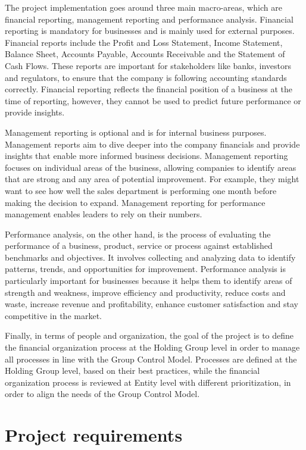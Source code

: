 \documentclass[12pt,a4paper,openright,twoside]{book}
\begin{document}
The project implementation goes around three main macro-areas, which are financial reporting, management reporting and performance analysis.
%
Financial reporting is mandatory for businesses and is mainly used for external purposes.
%
Financial reports include the Profit and Loss Statement, Income Statement, Balance Sheet, Accounts Payable, Accounts Receivable and the Statement of Cash Flows.
%
These reports are important for stakeholders like banks, investors and regulators, to ensure that the company is following accounting standards correctly.
%
Financial reporting reflects the financial position of a business at the time of reporting, however, they cannot be used to predict future performance or provide insights.

Management reporting is optional and is for internal business purposes. 
%
Management reports aim to dive deeper into the company financials and provide insights that enable more informed business decisions. 
%
Management reporting focuses on individual areas of the business, allowing companies to identify areas that are strong and any area of potential improvement. 
%
For example, they might want to see how well the sales department is performing one month before making the decision to expand. Management reporting for performance management enables leaders to rely on their numbers.

Performance analysis, on the other hand, is the process of evaluating the performance of a business, product, service or process against established benchmarks and objectives. 
%
It involves collecting and analyzing data to identify patterns, trends, and opportunities for improvement.
%
Performance analysis is particularly important for businesses because it helps them to identify areas of strength and weakness, improve efficiency and productivity, reduce costs and waste, increase revenue and profitability, enhance customer satisfaction and stay competitive in the market.

Finally, in terms of people and organization, the goal of the project is to define the financial organization process at the Holding Group level in order to manage all processes in line with the Group Control Model.
%
Processes are defined at the Holding Group level, based on their best practices, while the financial organization process is reviewed at Entity level with different prioritization, in order to align the needs of the Group Control Model.

\section{Project requirements}
\end{document}

